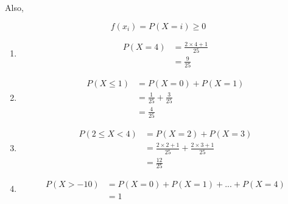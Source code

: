 \documentclass{article}
\begin{document}
Also,

\begin{equation*}
    f(x_i) = P(X = i) \geq 0
\end{equation*}

\begin{enumerate}[label=(\alph*)]
    \item
        \begin{equation*}
            \begin{aligned}
                P(X = 4) &= \frac{2 \times 4 + 1}{25} \\
                         &= \frac{9}{25}
            \end{aligned}
        \end{equation*}
    \item
        \begin{equation*}
            \begin{aligned}
                P(X \leq 1) &= P(X = 0) + P(X = 1) \\
                            &= \frac{1}{25} + \frac{3}{25} \\
                            &= \frac{4}{25}
            \end{aligned}
        \end{equation*}

    \item
        \begin{equation*}
            \begin{aligned}
                P(2 \leq X < 4) &= P(X = 2) + P(X = 3) \\
                                &= \frac{2 \times 2 + 1}{25}
                                    + \frac{2 \times 3 + 1}{25} \\
                                &= \frac{12}{25}
            \end{aligned}
        \end{equation*}

    \item
        \begin{equation*}
            \begin{aligned}
                P(X > -10) &= P(X = 0) + P(X = 1) + ... + P(X = 4) \\
                           &= 1
            \end{aligned}
        \end{equation*}
\end{enumerate}
\end{document}

